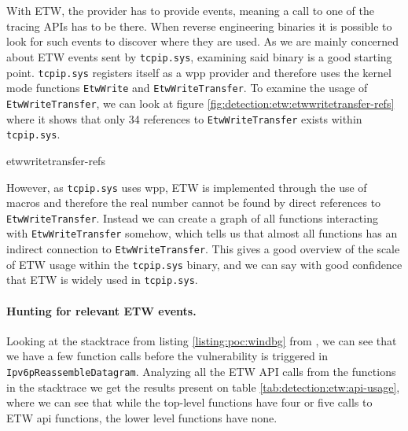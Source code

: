 \documentclass{report}
\begin{document}
\section{}
\label{sec:detection:etw}
With \gls{ETW}, the provider has to provide events, meaning a call to one of the tracing APIs has to be there. When reverse engineering binaries it is possible to look for such events to discover where they are used. As we are mainly concerned about \gls{ETW} events sent by \texttt{tcpip.sys}, examining said binary is a good starting point. \texttt{tcpip.sys} registers itself as a \gls{wpp} provider and therefore uses the kernel mode functions \texttt{EtwWrite} and \texttt{EtwWriteTransfer}\cite{url:etw:kernel-mode-functions}. To examine the usage of \texttt{EtwWriteTransfer}, we can look at figure \ref{fig:detection:etw:etwwritetransfer-refs} where it shows that only 34 references to \texttt{EtwWriteTransfer} exists within \texttt{tcpip.sys}.

{etwwritetransfer-refs}

However, as \texttt{tcpip.sys} uses \gls{wpp}, \gls{ETW} is implemented through the use of macros\cite{url:etw:wpp:kernel-drivers} and therefore the real number cannot be found by direct references to \texttt{EtwWriteTransfer}. Instead we can create a graph of all functions interacting with \texttt{EtwWriteTransfer} somehow, which tells us that almost all functions has an indirect connection to \texttt{EtwWriteTransfer}. This gives a good overview of the scale of \gls{ETW} usage within the \texttt{tcpip.sys} binary, and we can say with good confidence that \gls{ETW} is widely used in \texttt{tcpip.sys}.

\paragraph{Hunting for relevant \gls{ETW} events.} Looking at the stacktrace from listing \ref{listing:poc:windbg} from , we can see that we have a few function calls before the vulnerability is triggered in \texttt{Ipv6pReassembleDatagram}. Analyzing all the \gls{ETW} API calls from the functions in the stacktrace we get the results present on table \ref{tab:detection:etw:api-usage}, where we can see that while the top-level functions have four or five calls to \gls{ETW} api functions, the lower level functions have none.
\end{document}
